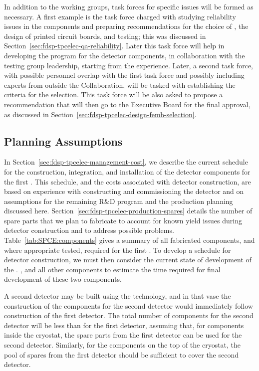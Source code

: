 In addition to the working groups, task forces for specific issues 
will be formed as necessary. A first example is the task force
charged with studying reliability issues in the  
components and preparing recommendations for the choice of 
, the design of printed circuit boards, and testing; this
was discussed in Section~\ref{sec:fdsp-tpcelec-qa-reliability}. 
Later this task force will help in developing the  
program for the  detector components, in collaboration
with the testing group leadership, starting from the  
experience. Later, a second task force, with possible
personnel overlap with the first task force and possibly including experts
from outside the  Collaboration, will be tasked with establishing the
criteria for the  selection. This task force will
be also asked to propose a recommendation that will then go to
the  Executive Board for the final approval, as discussed
in Section~\ref{sec:fdsp-tpcelec-design-femb-selection}.

\subsection{Planning Assumptions}
\label{sec:fdsp-tpcelec-management-planning}

In Section~\ref{sec:fdsp-tpcelec-management-cost}, we describe
the current schedule for the construction, integration, and installation
of the  detector components for the first   . This schedule, and the costs associated
with detector construction, are based on experience with constructing and commissioning the 
detector and on assumptions for the remaining R\&D program
and the production planning discussed here. 
Section~\ref{sec:fdsp-tpcelec-production-spares} details
the number of spare parts that we plan to fabricate to
account for known yield issues during detector construction
and to address possible problems. Table~\ref{tab:SPCE:components}
gives a summary of all fabricated components, and where
appropriate tested, required for the first 
 . To develop a schedule for detector construction, 
we must then consider the current state of development of 
the . , and all other components to 
estimate the time required for final development of these
two components.

A second detector may be built using the  technology, 
and in that vase the construction of the  components 
for the second detector would immediately follow construction of 
the first detector. The total number of components for the second 
detector will be less than for the first detector, assuming that, 
for components inside the cryostat, the spare parts from the first 
detector can be used for the second detector. Similarly, for the 
components on the top of the cryostat, the
pool of spares from the first detector should be sufficient to cover
the second detector.

